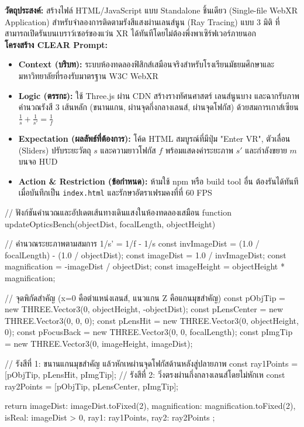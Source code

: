 \begin{aipromptbox}
\textbf{วัตถุประสงค์:} สร้างไฟล์ HTML/JavaScript แบบ Standalone ชิ้นเดียว (Single-file WebXR Application) สำหรับจำลองการติดตามรังสีแสงผ่านเลนส์นูน (Ray Tracing) แบบ 3 มิติ ที่สามารถเปิดรันบนเบราว์เซอร์ของแว่น XR ได้ทันทีโดยไม่ต้องพึ่งพาเซิร์ฟเวอร์ภายนอก\\
\textbf{โครงสร้าง CLEAR Prompt:}
\begin{itemize}[topsep=1pt, itemsep=1pt, leftmargin=1.2em]
    \item \textbf{Context (บริบท):} ระบบห้องทดลองฟิสิกส์เสมือนจริงสำหรับโรงเรียนมัธยมศึกษาและมหาวิทยาลัยที่รองรับมาตรฐาน W3C WebXR
    \item \textbf{Logic (ตรรกะ):} ใช้ Three.js ผ่าน CDN สร้างรางทัศนศาสตร์ เลนส์นูนบาง และฉากรับภาพ คำนวณรังสี 3 เส้นหลัก (ขนานแกน, ผ่านจุดกึ่งกลางเลนส์, ผ่านจุดโฟกัส) ด้วยสมการเกาส์เซียน $\frac{1}{s} + \frac{1}{s'} = \frac{1}{f}$
    \item \textbf{Expectation (ผลลัพธ์ที่ต้องการ):} โค้ด HTML สมบูรณ์ที่มีปุ่ม "Enter VR", ตัวเลื่อน (Sliders) ปรับระยะวัตถุ $s$ และความยาวโฟกัส $f$ พร้อมแสดงค่าระยะภาพ $s'$ และกำลังขยาย $m$ บนจอ HUD
    \item \textbf{Action \& Restriction (ข้อกำหนด):} ห้ามใช้ npm หรือ build tool อื่น ต้องรันได้ทันทีเมื่อบันทึกเป็น \texttt{index.html} และรักษาอัตราเฟรมคงที่ที่ 60 FPS
\end{itemize}
\end{aipromptbox}

\begin{codebox}
// ฟังก์ชันคำนวณและอัปเดตเส้นทางเดินแสงในห้องทดลองเสมือน
function updateOpticsBench(objectDist, focalLength, objectHeight) {
    // คำนวณระยะภาพตามสมการ 1/s' = 1/f - 1/s
    const invImageDist = (1.0 / focalLength) - (1.0 / objectDist);
    const imageDist = 1.0 / invImageDist;
    const magnification = -imageDist / objectDist;
    const imageHeight = objectHeight * magnification;

    // จุดพิกัดสำคัญ (x=0 คือตำแหน่งเลนส์, แนวแกน Z คือแกนมุขสำคัญ)
    const pObjTip = new THREE.Vector3(0, objectHeight, -objectDist);
    const pLensCenter = new THREE.Vector3(0, 0, 0);
    const pLensHit = new THREE.Vector3(0, objectHeight, 0);
    const pFocusBack = new THREE.Vector3(0, 0, focalLength);
    const pImgTip = new THREE.Vector3(0, imageHeight, imageDist);

    // รังสีที่ 1: ขนานแกนมุขสำคัญ แล้วหักเหผ่านจุดโฟกัสด้านหลังสู่ปลายภาพ
    const ray1Points = [pObjTip, pLensHit, pImgTip];
    // รังสีที่ 2: วิ่งตรงผ่านกึ่งกลางเลนส์โดยไม่หักเห
    const ray2Points = [pObjTip, pLensCenter, pImgTip];

    return {
        imageDist: imageDist.toFixed(2),
        magnification: magnification.toFixed(2),
        isReal: imageDist > 0,
        ray1: ray1Points,
        ray2: ray2Points
    };
}
\end{codebox}

